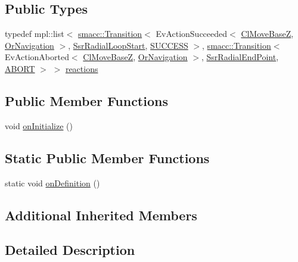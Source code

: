 \subsection*{Public Types}
\begin{DoxyCompactItemize}
\item 
typedef mpl\+::list$<$ \hyperlink{classsmacc_1_1Transition}{smacc\+::\+Transition}$<$ Ev\+Action\+Succeeded$<$ \hyperlink{classmove__base__z__client_1_1ClMoveBaseZ}{Cl\+Move\+BaseZ}, \hyperlink{classsm__dance__bot__2_1_1OrNavigation}{Or\+Navigation} $>$, \hyperlink{structsm__dance__bot__2_1_1radial__motion__states_1_1SsrRadialLoopStart}{Ssr\+Radial\+Loop\+Start}, \hyperlink{classSUCCESS}{S\+U\+C\+C\+E\+SS} $>$, \hyperlink{classsmacc_1_1Transition}{smacc\+::\+Transition}$<$ Ev\+Action\+Aborted$<$ \hyperlink{classmove__base__z__client_1_1ClMoveBaseZ}{Cl\+Move\+BaseZ}, \hyperlink{classsm__dance__bot__2_1_1OrNavigation}{Or\+Navigation} $>$, \hyperlink{structsm__dance__bot__2_1_1radial__motion__states_1_1SsrRadialEndPoint}{Ssr\+Radial\+End\+Point}, \hyperlink{classABORT}{A\+B\+O\+RT} $>$ $>$ \hyperlink{structsm__dance__bot__2_1_1radial__motion__states_1_1SsrRadialReturn_a2c537fae7d4f9e6ef6a456a04e605236}{reactions}
\end{DoxyCompactItemize}
\subsection*{Public Member Functions}
\begin{DoxyCompactItemize}
\item 
void \hyperlink{structsm__dance__bot__2_1_1radial__motion__states_1_1SsrRadialReturn_a6ab795bc103bbead69bdb1905b5cd664}{on\+Initialize} ()
\end{DoxyCompactItemize}
\subsection*{Static Public Member Functions}
\begin{DoxyCompactItemize}
\item 
static void \hyperlink{structsm__dance__bot__2_1_1radial__motion__states_1_1SsrRadialReturn_a4f3ce85836ffc4e022130b696e2fc430}{on\+Definition} ()
\end{DoxyCompactItemize}
\subsection*{Additional Inherited Members}


\subsection{Detailed Description}


